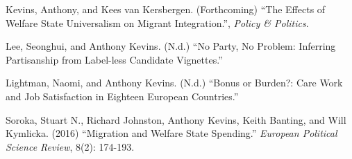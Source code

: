 \documentclass[letterpaper]{scrartcl}
\begin{document}
\begin{hangparas}{.25in}{1}
    Kevins, Anthony, and Kees van Kersbergen. (Forthcoming) ``The Effects of Welfare State Universalism on Migrant Integration.'', \textit{Policy \& Politics}. \vspace{-.5em}

    Lee, Seonghui, and Anthony Kevins. (N.d.) ``No Party, No Problem: Inferring Partisanship from Label-less Candidate Vignettes.'' \vspace{-.5em}

    Lightman, Naomi, and Anthony Kevins. (N.d.) ``Bonus or Burden?: Care Work and Job Satisfaction in Eighteen European Countries.''
    \vspace{-.5em}

    Soroka, Stuart N., Richard Johnston, Anthony Kevins, Keith Banting, and Will Kymlicka. (2016) ``Migration and Welfare State Spending.'' \textit{European Political Science Review}, 8(2): 174-193.

  \end{hangparas}
\end{document}
